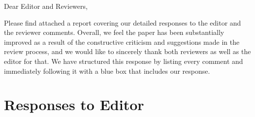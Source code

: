 \documentclass[11pt, a4paper, answers]{exam}
\begin{document}
\noindent Dear Editor and Reviewers, \bigskip\bigskip

Please find attached a report covering our detailed responses to the editor and 
the reviewer comments. Overall, we feel the paper has been substantially improved 
as a result of the constructive criticism and suggestions made in the  review process,
and we would like to sincerely thank both reviewers as well as the editor for
that. We have structured this response by listing every
comment and immediately following it with a blue box that includes our
response.

\clearpage

\section*{Responses to Editor}
\end{document}
